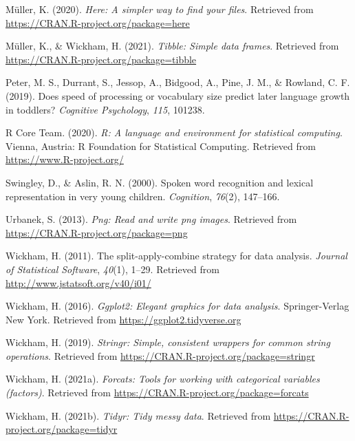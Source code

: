 \documentclass[
  english,
  man,floatsintext]{apa6}
\begin{document}
\leavevmode\hypertarget{ref-R-here}{}%
Müller, K. (2020). \emph{Here: A simpler way to find your files}. Retrieved from \url{https://CRAN.R-project.org/package=here}

\leavevmode\hypertarget{ref-R-tibble}{}%
Müller, K., \& Wickham, H. (2021). \emph{Tibble: Simple data frames}. Retrieved from \url{https://CRAN.R-project.org/package=tibble}

\leavevmode\hypertarget{ref-peter2019}{}%
Peter, M. S., Durrant, S., Jessop, A., Bidgood, A., Pine, J. M., \& Rowland, C. F. (2019). Does speed of processing or vocabulary size predict later language growth in toddlers? \emph{Cognitive Psychology}, \emph{115}, 101238.

\leavevmode\hypertarget{ref-R-base}{}%
R Core Team. (2020). \emph{R: A language and environment for statistical computing}. Vienna, Austria: R Foundation for Statistical Computing. Retrieved from \url{https://www.R-project.org/}

\leavevmode\hypertarget{ref-Swingley2000}{}%
Swingley, D., \& Aslin, R. N. (2000). Spoken word recognition and lexical representation in very young children. \emph{Cognition}, \emph{76}(2), 147--166.

\leavevmode\hypertarget{ref-R-png}{}%
Urbanek, S. (2013). \emph{Png: Read and write png images}. Retrieved from \url{https://CRAN.R-project.org/package=png}

\leavevmode\hypertarget{ref-R-plyr}{}%
Wickham, H. (2011). The split-apply-combine strategy for data analysis. \emph{Journal of Statistical Software}, \emph{40}(1), 1--29. Retrieved from \url{http://www.jstatsoft.org/v40/i01/}

\leavevmode\hypertarget{ref-R-ggplot2}{}%
Wickham, H. (2016). \emph{Ggplot2: Elegant graphics for data analysis}. Springer-Verlag New York. Retrieved from \url{https://ggplot2.tidyverse.org}

\leavevmode\hypertarget{ref-R-stringr}{}%
Wickham, H. (2019). \emph{Stringr: Simple, consistent wrappers for common string operations}. Retrieved from \url{https://CRAN.R-project.org/package=stringr}

\leavevmode\hypertarget{ref-R-forcats}{}%
Wickham, H. (2021a). \emph{Forcats: Tools for working with categorical variables (factors)}. Retrieved from \url{https://CRAN.R-project.org/package=forcats}

\leavevmode\hypertarget{ref-R-tidyr}{}%
Wickham, H. (2021b). \emph{Tidyr: Tidy messy data}. Retrieved from \url{https://CRAN.R-project.org/package=tidyr}
\end{document}
